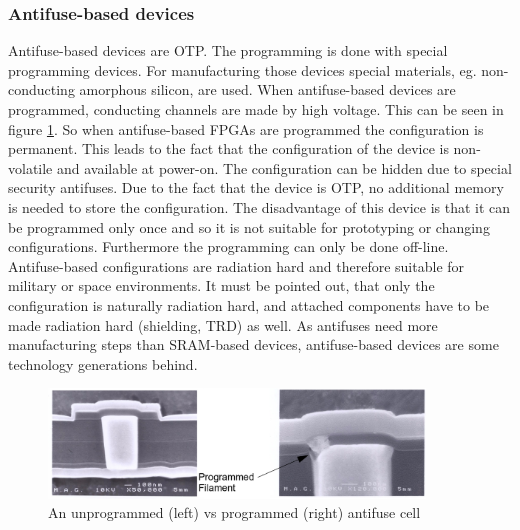 \subsubsection{Antifuse-based devices}
Antifuse-based devices are OTP. The programming is done with special programming devices. For manufacturing those devices special materials, eg. non-conducting amorphous silicon, are used.\cite{Zeif2011} When antifuse-based devices are programmed, conducting channels are made by high voltage. This can be seen in figure \ref{fig:antifusevorhernachher}. So when antifuse-based FPGAs are programmed the configuration is permanent. This leads to the fact that the configuration of the device is non-volatile and available at power-on. The configuration can be hidden due to special security antifuses. Due to the fact that the device is OTP, no additional memory is needed to store the configuration. The disadvantage of this device is that it can be programmed only once and so it is not suitable for prototyping or changing configurations. Furthermore the programming can only be done off-line.\\
Antifuse-based configurations are radiation hard and therefore suitable for military or space environments.\cite{Maxfield2009} It must be pointed out, that only the configuration is naturally radiation hard, and attached components have to be made radiation hard (shielding, TRD) as well. As antifuses need more manufacturing steps than SRAM-based devices, antifuse-based devices are some technology generations behind.
\begin{figure}[htbp]
\begin{center}
\includegraphics[width=10cm,keepaspectratio=true]{bilder/png/antifusevorhernachher}
\caption{An unprogrammed (left) vs programmed (right) antifuse cell \cite{Qui16}}
\label{fig:antifusevorhernachher}
\end{center}
\end{figure}
